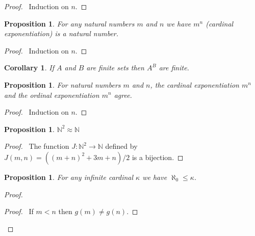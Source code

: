 \documentclass{book}
\let\qed\relax
\newtheorem{prop}[ax]{Proposition}
\newtheorem{cor}{Corollary}[ax]
\theoremstyle{definition}
\begin{document}
\begin{proof}
\pf\ Induction on $n$. \qed
\end{proof}

\begin{prop}
For any natural numbers $m$ and $n$ we have $m^n$  (cardinal exponentiation) is a natural number.
\end{prop}

\begin{proof}
\pf\ Induction on $n$.
\end{proof}

\begin{cor}
If $A$ and $B$ are finite sets then $A^B$ are finite.
\end{cor}

\begin{prop}
For natural numbers $m$ and $n$, the cardinal exponentiation $m^n$ and the ordinal exponentiation $m^n$ agree.
\end{prop}

\begin{proof}
\pf\ Induction on $n$. \qed
\end{proof}

\begin{prop}
\label{prop:N^2approxN}
$\mathbb{N}^2 \approx \mathbb{N}$
\end{prop}

\begin{proof}
\pf\ The function $J : \mathbb{N}^2 \rightarrow \mathbb{N}$ defined by $J(m,n) = ((m+n)^2 + 3m + n)/2$ is a bijection. \qed
\end{proof}

\begin{prop}
\label{prop:aleph0least}
For any infinite cardinal $\kappa$ we have $\aleph_0 \leq \kappa$.
\end{prop}

\begin{proof}
\pf
{}
\begin{proof}
	\pf\ If $m < n$ then $g(m) \neq g(n)$.
\end{proof}
\qed
\end{proof}
\end{document}
